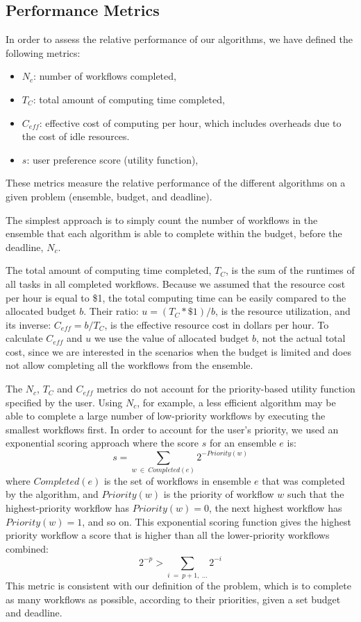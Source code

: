 \documentclass[conference]{IEEEtran}
\begin{document}
\subsection{Performance Metrics}
\label{sec:perf_metric}

In order to assess the relative performance of our algorithms, we have defined the following metrics:

\begin{itemize}
  \item $N_c$: number of workflows completed,
  \item $T_C$: total amount of computing time completed,
  \item $C_{eff}$: effective cost of computing per hour, which includes overheads due to the cost of idle resources.
  \item $s$: user preference score (utility function),
\end{itemize}

These metrics measure the relative performance of the different algorithms on a given problem (ensemble, budget, and deadline).

The simplest approach is to simply count the number of workflows in the ensemble that each algorithm is able to complete within the budget, before the deadline, $N_c$.

The total amount of computing time completed, $T_C$, is the sum of the runtimes of all tasks in all completed workflows. Because we assumed that the resource cost per hour is equal to \$1, the total computing time can be easily compared to the allocated budget $b$. Their ratio: $u = (T_C * \$1)/b$, is the resource utilization, and its inverse: $C_{eff} = b/T_C$, is the effective resource cost in dollars per hour. To calculate $C_{eff}$ and $u$ we use the value of allocated budget $b$, not the actual total cost, since we are interested in the scenarios when the budget is limited and does not allow completing all the workflows from the ensemble.

The $N_c$, $T_C$ and $C_{eff}$ metrics do not account for the priority-based utility function specified by the user. Using $N_c$, for example, a less efficient algorithm may be able to complete a large number of low-priority workflows by executing the smallest workflows first. In order to account for the user's priority, we used an exponential scoring approach where the score $s$ for an ensemble $e$ is:
%
$$
s = \sum_{w~\in~Completed(e)}{2^{-Priority(w)}}
$$
%
where $Completed(e)$ is the set of workflows in ensemble $e$ that was completed by the algorithm, and $Priority(w)$ is the priority of workflow $w$ such that the highest-priority workflow has $Priority(w)=0$, the next highest workflow has $Priority(w)=1$, and so on. This exponential scoring function gives the highest priority workflow a score that is higher than all the lower-priority workflows combined:
%
$$
2^{-p} > \sum_{i~=~p+1,~\ldots}2^{-i}
$$
%
This metric is consistent with our definition of the problem, which is to complete as many workflows as possible, according to their priorities, given a set budget and deadline.
\end{document}
